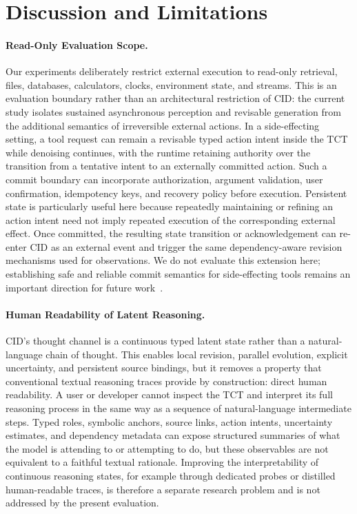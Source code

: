 \section{Discussion and Limitations}
\label{sec:discussion}

\paragraph{Read-Only Evaluation Scope.}
Our experiments deliberately restrict external execution to read-only retrieval, files, databases, calculators, clocks, environment state, and streams. This is an evaluation boundary rather than an architectural restriction of CID: the current study isolates sustained asynchronous perception and revisable generation from the additional semantics of irreversible external actions. In a side-effecting setting, a tool request can remain a revisable typed action intent inside the TCT while denoising continues, with the runtime retaining authority over the transition from a tentative intent to an externally committed action. Such a commit boundary can incorporate authorization, argument validation, user confirmation, idempotency keys, and recovery policy before execution. Persistent state is particularly useful here because repeatedly maintaining or refining an action intent need not imply repeated execution of the corresponding external effect. Once committed, the resulting state transition or acknowledgement can re-enter CID as an external event and trigger the same dependency-aware revision mechanisms used for observations. We do not evaluate this extension here; establishing safe and reliable commit semantics for side-effecting tools remains an important direction for future work~\citep{yao2024taubench,lu2024toolsandbox}.

\paragraph{Human Readability of Latent Reasoning.}
CID's thought channel is a continuous typed latent state rather than a natural-language chain of thought. This enables local revision, parallel evolution, explicit uncertainty, and persistent source bindings, but it removes a property that conventional textual reasoning traces provide by construction: direct human readability. A user or developer cannot inspect the TCT and interpret its full reasoning process in the same way as a sequence of natural-language intermediate steps. Typed roles, symbolic anchors, source links, action intents, uncertainty estimates, and dependency metadata can expose structured summaries of what the model is attending to or attempting to do, but these observables are not equivalent to a faithful textual rationale. Improving the interpretability of continuous reasoning states, for example through dedicated probes or distilled human-readable traces, is therefore a separate research problem and is not addressed by the present evaluation.
